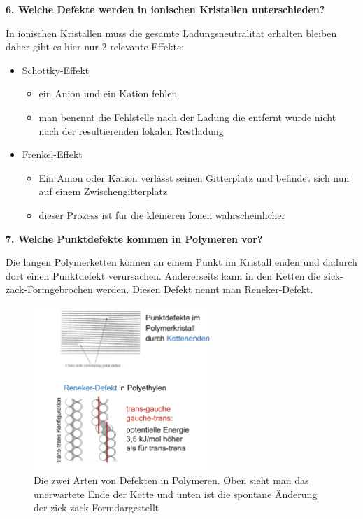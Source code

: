 \noindent\textbf{6. Welche Defekte werden in ionischen Kristallen unterschieden?}\\
\begin{addmargin}[25pt]{0pt}     
In ionischen Kristallen muss die gesamte Ladungsneutralität erhalten bleiben daher gibt es hier nur 2 relevante Effekte:
\begin{itemize}
    \item Schottky-Effekt
    \begin{itemize}
        \item ein Anion und ein Kation fehlen
        \item man benennt die Fehlstelle nach der Ladung die entfernt wurde nicht nach der resultierenden lokalen Restladung 
    \end{itemize}
    \item Frenkel-Effekt
    \begin{itemize}
        \item Ein Anion oder Kation verlässt seinen Gitterplatz und befindet sich nun auf einem Zwischengitterplatz
        \item dieser Prozess ist für die kleineren Ionen wahrscheinlicher
    \end{itemize}
\end{itemize}
\end{addmargin}
\newpage
\noindent\textbf{7. Welche Punktdefekte kommen in Polymeren vor?}\\
\begin{addmargin}[25pt]{0pt}   
Die langen Polymerketten können an einem Punkt im Kristall enden und dadurch dort einen Punktdefekt verursachen. Andererseits kann in den Ketten die \glqq zick-zack-Form\grqq gebrochen werden. Diesen Defekt nennt man Reneker-Defekt.
\begin{figure}[h]
    \centering
    \includegraphics[width = 0.6\textwidth]{images/Materialwissenschaften/Polymerdefekte.jpeg}
    \caption{Die zwei Arten von Defekten in Polymeren. Oben sieht man das unerwartete Ende der Kette und unten ist die spontane Änderung der \glqq zick-zack-Form\grqq dargestellt}
    \label{fig:Polymerdefekte}
\end{figure}
\end{addmargin}

